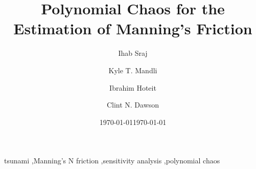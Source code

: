 \documentclass[preprint,12pt]{elsarticle}
\begin{document}
\ifpdf
{}
\else
{}
\fi

\begin{frontmatter}

\title{Polynomial Chaos for
 the Estimation of Manning's Friction}
\date{\today}

\author[kaust]{Ihab Sraj}
\author[ut]{Kyle T. Mandli}
\author[kaust]{Ibrahim Hoteit}
\author[ut]{Clint N. Dawson}

\address[kaust]{Department of Physical Sciences and Engineering, King Abdullah University for Science and Technology, Thuwal, Saudi Arabia}
\address[ut]{Institute for Computational Engineering and Science, University of Texas at Austin, 201 E 24th ST. Stop C0200, Austin, TX 78712-1229, USA}

\date{\today}

\begin{abstract}

\end{abstract}

\begin{keyword}
tsunami \sep Manning's N friction \sep sensitivity analysis \sep polynomial chaos
\end{keyword}

\end{frontmatter}
\linenumbers

% 








\clearpage

 

\clearpage


\end{document}
